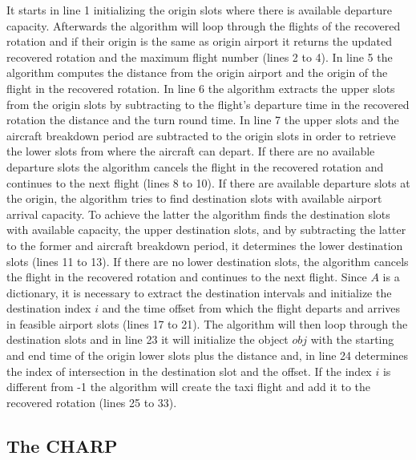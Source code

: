 It starts in line 1  initializing the origin slots where there is available departure capacity. Afterwards the algorithm will loop through the flights of the recovered rotation  and if their origin is the same as origin airport it returns the updated recovered rotation and the maximum flight number (lines 2 to 4). In line 5 the algorithm computes the distance from the origin airport and the origin of the flight in the recovered rotation. In line 6 the algorithm extracts the upper slots from the origin slots by subtracting to the flight's departure time in the recovered rotation the distance and the turn round time. In line 7 the upper slots and the aircraft breakdown period are subtracted to the origin slots in order to retrieve the lower slots from where the aircraft can depart. If there are no available departure slots the algorithm cancels the flight in the recovered rotation and continues to the next flight (lines 8 to 10). If there are available departure slots at the origin, the algorithm tries to find destination slots with available airport arrival capacity. To achieve the latter the algorithm finds the destination slots with available capacity, the upper destination slots, and by subtracting the latter to the former and aircraft breakdown period, it  determines the lower destination slots (lines 11 to 13). If there are no lower destination slots, the algorithm cancels the flight in the recovered rotation and continues to the next flight. Since $A$ is a dictionary, it is necessary to extract the destination intervals and initialize the destination index $i$ and the time offset from which the flight departs and arrives in feasible airport slots (lines 17 to 21). The algorithm will then loop through the destination slots and in line 23 it will initialize the object $obj$ with the starting and end time of the origin lower slots plus the distance and, in line 24 determines the index of intersection in the destination slot and the offset. If the index $i$ is different from -1 the algorithm will create the taxi flight and add it to the recovered rotation (lines 25 to 33).\\ 

\subsection{The CHARP} \label{sec:charp}

